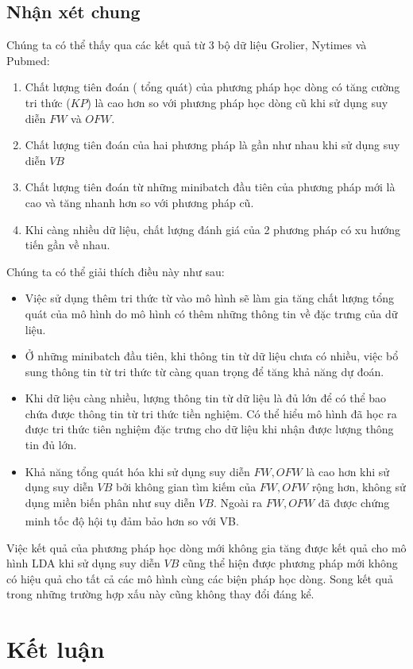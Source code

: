 \documentclass[fontsize=13pt]{scrartcl}
\begin{document}
\subsection{Nhận xét chung}
Chúng ta có thể thấy qua các kết quả từ 3 bộ dữ liệu Grolier, Nytimes và Pubmed: 
\begin{enumerate}
\item Chất lượng tiên đoán ( tổng quát) của phương pháp học dòng có tăng cường tri thức ($KP$) là cao hơn so với phương pháp học dòng cũ khi sử dụng suy diễn $FW$ và $OFW$.
\item Chất lượng tiên đoán của hai phương pháp là gần như nhau khi sử dụng suy diễn $VB$
\item Chất lượng tiên đoán từ những minibatch đầu tiên của phương pháp mới là cao và tăng nhanh hơn so với phương pháp cũ.
\item Khi càng nhiều dữ liệu, chất lượng đánh giá của 2 phương pháp có xu hướng tiến gần về nhau.
\end{enumerate}
Chúng ta có thể giải thích điều này như sau:\\
\begin{itemize}
\item Việc sử dụng thêm tri thức từ vào mô hình sẽ làm gia tăng chất lượng tổng quát của mô hình do mô hình có thêm những thông tin về đặc trưng của dữ liệu.
\item Ở những minibatch đầu tiên, khi thông tin từ dữ liệu chưa có nhiều, việc bổ sung thông tin từ tri thức từ càng quan trọng để tăng khả năng dự đoán.
\item Khi dữ liệu càng nhiều, lượng thông tin từ dữ liệu là đủ lớn để có thể bao chứa được thông tin từ tri thức tiền nghiệm. Có thể hiểu mô hình đã học ra được tri thức tiên nghiệm đặc trưng cho dữ liệu khi nhận được lượng thông tin đủ lớn.
\item Khả năng tổng quát hóa khi sử dụng suy diễn $FW, OFW$ là cao hơn khi sử dụng suy diễn $VB$ bởi không gian tìm kiếm của $FW, OFW$ rộng hơn, không sử dụng miền biến phân như suy diễn $VB$. Ngoài ra $FW, OFW$ đã được chứng minh tốc độ hội tụ đảm bảo hơn so với VB.\textsuperscript{\cite{dualonline}}
\end{itemize}
Việc kết quả của phương pháp học dòng mới không gia tăng được kết quả cho mô hình LDA khi sử dụng suy diễn $VB$ cũng thể hiện được phương pháp mới không có hiệu quả cho tất cả các mô hình cùng các biện pháp học dòng. Song kết quả trong những trường hợp xấu này cũng không thay đổi đáng kể.


\newpage
\section{Kết luận}
\label{sec:conclusion}
\end{document}
